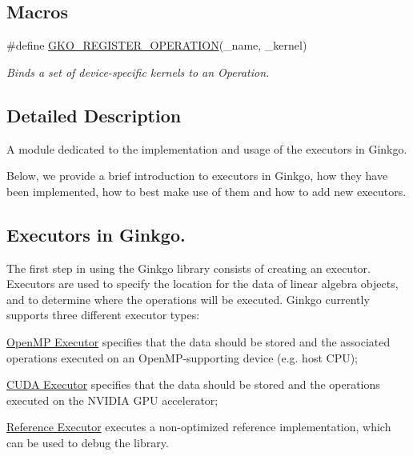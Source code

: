 \subsection*{Macros}
\begin{DoxyCompactItemize}
\item 
\#define \hyperlink{group__Executor_ga7f2c119ff9f4f51c7f8e2d5dbbbbd044}{G\+K\+O\+\_\+\+R\+E\+G\+I\+S\+T\+E\+R\+\_\+\+O\+P\+E\+R\+A\+T\+I\+ON}(\+\_\+name,  \+\_\+kernel)
\begin{DoxyCompactList}\small\item\em Binds a set of device-\/specific kernels to an Operation. \end{DoxyCompactList}\end{DoxyCompactItemize}


\subsection{Detailed Description}
A module dedicated to the implementation and usage of the executors in Ginkgo. 

Below, we provide a brief introduction to executors in Ginkgo, how they have been implemented, how to best make use of them and how to add new executors.\hypertarget{group__Executor_exec_1}{}\subsection{Executors in Ginkgo.}\label{group__Executor_exec_1}
The first step in using the Ginkgo library consists of creating an executor. Executors are used to specify the location for the data of linear algebra objects, and to determine where the operations will be executed. Ginkgo currently supports three different executor types\+:


\begin{DoxyItemize}
\item \hyperlink{group__exec__omp}{Open\+MP Executor} specifies that the data should be stored and the associated operations executed on an Open\+M\+P-\/supporting device (e.\+g. host C\+PU);
\item \hyperlink{group__exec__cuda}{C\+U\+DA Executor} specifies that the data should be stored and the operations executed on the N\+V\+I\+D\+IA G\+PU accelerator;
\item \hyperlink{group__exec__ref}{Reference Executor} executes a non-\/optimized reference implementation, which can be used to debug the library. 
\end{DoxyItemize}

